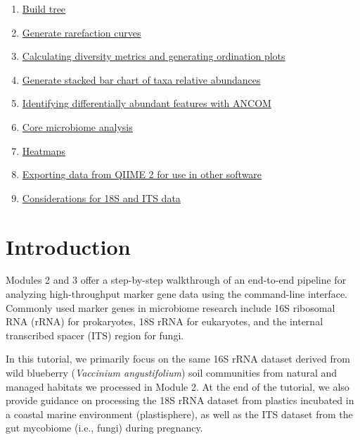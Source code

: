 \documentclass[
]{book}
\providecommand{\tightlist}{%
  \setlength{\itemsep}{0pt}\setlength{\parskip}{0pt}}
\begin{document}
\begin{enumerate}
\def\labelenumi{\arabic{enumi}.}
\tightlist
\item
  \hyperref[build-tree]{Build tree}\\
\item
  \hyperref[rarefaction-curves]{Generate rarefaction curves}\\
\item
  \hyperref[diversity-ordination]{Calculating diversity metrics and generating ordination plots}\\
\item
  \hyperref[stacked-bar-chart]{Generate stacked bar chart of taxa relative abundances}\\
\item
  \hyperref[ancom]{Identifying differentially abundant features with ANCOM}\\
\item
  \hyperref[core-microbiome]{Core microbiome analysis}\\
\item
  \hyperref[heatmaps]{Heatmaps}\\
\item
  \hyperref[exporting-data]{Exporting data from QIIME 2 for use in other software}\\
\item
  \hyperref[18s-its]{Considerations for 18S and ITS data}
\end{enumerate}

\section{Introduction}\label{introduction-2}

Modules 2 and 3 offer a step-by-step walkthrough of an end-to-end pipeline for analyzing high-throughput marker gene data using the command-line interface. Commonly used marker genes in microbiome research include 16S ribosomal RNA (rRNA) for prokaryotes, 18S rRNA for eukaryotes, and the internal transcribed spacer (ITS) region for fungi.

In this tutorial, we primarily focus on the same 16S rRNA dataset derived from wild blueberry (\emph{Vaccinium angustifolium}) soil communities from natural and managed habitats we processed in Module 2. At the end of the tutorial, we also provide guidance on processing the 18S rRNA dataset from plastics incubated in a coastal marine environment (plastisphere), as well as the ITS dataset from the gut mycobiome (i.e., fungi) during pregnancy.
\end{document}
